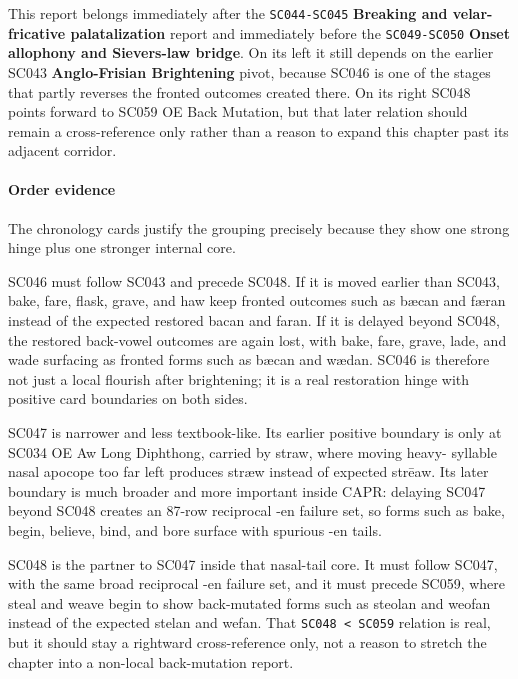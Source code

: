 \documentclass[
  british,
  a4paper,
]{article}
\begin{document}
This report belongs immediately after the \texttt{SC044-SC045}
\textbf{Breaking and velar-fricative palatalization} report and
immediately before the \texttt{SC049-SC050} \textbf{Onset allophony and
Sievers-law bridge}. On its left it still depends on the earlier SC043
\textbf{Anglo-Frisian Brightening} pivot, because SC046 is one of the
stages that partly reverses the fronted outcomes created there. On its
right SC048 points forward to SC059 OE Back Mutation, but that later
relation should remain a cross-reference only rather than a reason to
expand this chapter past its adjacent corridor.

\paragraph{Order evidence}\label{order-evidence-29}

The chronology cards justify the grouping precisely because they show
one strong hinge plus one stronger internal core.

SC046 must follow SC043 and precede SC048. If it is moved earlier than
SC043, bake, fare, flask, grave, and haw keep fronted outcomes such as
bæcan and færan instead of the expected restored bacan and faran. If it
is delayed beyond SC048, the restored back-vowel outcomes are again
lost, with bake, fare, grave, lade, and wade surfacing as fronted forms
such as bæcan and wædan. SC046 is therefore not just a local flourish
after brightening; it is a real restoration hinge with positive card
boundaries on both sides.

SC047 is narrower and less textbook-like. Its earlier positive boundary
is only at SC034 OE Aw Long Diphthong, carried by straw, where moving
heavy- syllable nasal apocope too far left produces stræw instead of
expected strēaw. Its later boundary is much broader and more important
inside CAPR: delaying SC047 beyond SC048 creates an 87-row reciprocal
-en failure set, so forms such as bake, begin, believe, bind, and bore
surface with spurious -en tails.

SC048 is the partner to SC047 inside that nasal-tail core. It must
follow SC047, with the same broad reciprocal -en failure set, and it
must precede SC059, where steal and weave begin to show back-mutated
forms such as steolan and weofan instead of the expected stelan and
wefan. That \texttt{SC048\ \textless{}\ SC059} relation is real, but it
should stay a rightward cross-reference only, not a reason to stretch
the chapter into a non-local back-mutation report.
\end{document}
